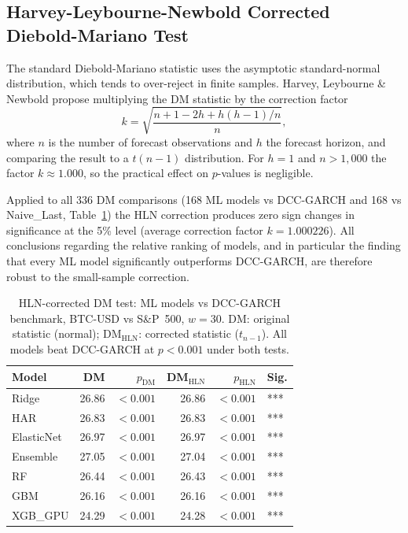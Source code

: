 \subsection{Harvey-Leybourne-Newbold Corrected Diebold-Mariano Test}

The standard Diebold-Mariano statistic uses the asymptotic standard-normal
distribution, which tends to over-reject in finite samples.
Harvey, Leybourne \& Newbold \cite{harvey1997testing} propose multiplying
the DM statistic by the correction factor
\begin{equation}
    k = \sqrt{\frac{n + 1 - 2h + h(h-1)/n}{n}},
\end{equation}
where $n$ is the number of forecast observations and $h$ the forecast horizon,
and comparing the result to a $t(n-1)$ distribution.
For $h = 1$ and $n > 1{,}000$ the factor $k \approx 1.000$, so the practical
effect on $p$-values is negligible.

Applied to all 336 DM comparisons (168 ML models vs DCC-GARCH and 168 vs
Naive\_Last, Table~\ref{tab:dm_hln}) the HLN correction produces zero sign
changes in significance at the 5\% level (average correction factor
$k = 1.000226$).
All conclusions regarding the relative ranking of models, and in particular
the finding that every ML model significantly outperforms DCC-GARCH, are
therefore robust to the small-sample correction.

\begin{table}[H]
    \centering
    \caption{HLN-corrected DM test: ML models vs DCC-GARCH benchmark,
             BTC-USD vs S\&P~500, $w = 30$.
             DM: original statistic (normal); DM$_\text{HLN}$: corrected
             statistic ($t_{n-1}$).
             All models beat DCC-GARCH at $p < 0.001$ under both tests.}
    \label{tab:dm_hln}
    \begin{tabular}{lrrrrl}
        \toprule
        Model & DM & $p_\text{DM}$ & DM$_\text{HLN}$ & $p_\text{HLN}$ & Sig. \\
        \midrule
        Ridge      & 26.86 & $<0.001$ & 26.86 & $<0.001$ & *** \\
        HAR        & 26.83 & $<0.001$ & 26.83 & $<0.001$ & *** \\
        ElasticNet & 26.97 & $<0.001$ & 26.97 & $<0.001$ & *** \\
        Ensemble   & 27.05 & $<0.001$ & 27.04 & $<0.001$ & *** \\
        RF         & 26.44 & $<0.001$ & 26.43 & $<0.001$ & *** \\
        GBM        & 26.16 & $<0.001$ & 26.16 & $<0.001$ & *** \\
        XGB\_GPU   & 24.29 & $<0.001$ & 24.28 & $<0.001$ & *** \\
        \bottomrule
    \end{tabular}
\end{table}

